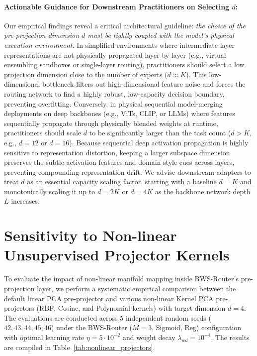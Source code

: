 \paragraph{Actionable Guidance for Downstream Practitioners on Selecting $d$:}
Our empirical findings reveal a critical architectural guideline: \emph{the choice of the pre-projection dimension $d$ must be tightly coupled with the model's physical execution environment.} 
In simplified environments where intermediate layer representations are not physically propagated layer-by-layer (e.g., virtual ensembling sandboxes or single-layer routing), practitioners should select a low projection dimension close to the number of experts ($d \approx K$). This low-dimensional bottleneck filters out high-dimensional feature noise and forces the routing network to find a highly robust, low-capacity decision boundary, preventing overfitting.
Conversely, in physical sequential model-merging deployments on deep backbones (e.g., ViTs, CLIP, or LLMs) where features sequentially propagate through physically blended weights at runtime, practitioners should scale $d$ to be significantly larger than the task count ($d > K$, e.g., $d=12$ or $d=16$). Because sequential deep activation propagation is highly sensitive to representation distortion, keeping a larger subspace dimension preserves the subtle activation features and domain style cues across layers, preventing compounding representation drift. We advise downstream adapters to treat $d$ as an essential capacity scaling factor, starting with a baseline $d = K$ and monotonically scaling it up to $d = 2K$ or $d = 4K$ as the backbone network depth $L$ increases.

\section{Sensitivity to Non-linear Unsupervised Projector Kernels}
\label{app:nonlinear_projectors}
To evaluate the impact of non-linear manifold mapping inside BWS-Router's pre-projection layer, we perform a systematic empirical comparison between the default linear PCA pre-projector and various non-linear Kernel PCA pre-projectors (RBF, Cosine, and Polynomial kernels) with target dimension $d = 4$. The evaluations are conducted across 5 independent random seeds ($42, 43, 44, 45, 46$) under the BWS-Router ($M=3$, Sigmoid, Reg) configuration with optimal learning rate $\eta = 5 \cdot 10^{-2}$ and weight decay $\lambda_{wd} = 10^{-4}$. The results are compiled in Table~\ref{tab:nonlinear_projectors}.

